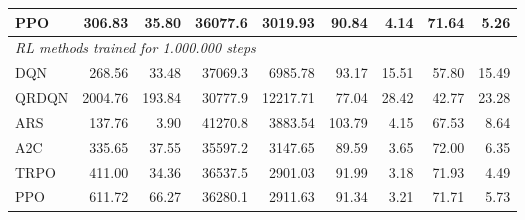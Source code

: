 \begin{samepage}
\begin{center}
\begin{tabular}{l|rr|rr|rr|rr}
    PPO          &   306.83 &    35.80 &    36077.6 &    3019.93 &   90.84 &    4.14 &   71.64 &    5.26 \\
    \midrule
    \multicolumn{9}{l}{\textit{RL methods trained for 1.000.000 steps}} \\
    \midrule
    DQN          &   268.56 &    33.48 &    37069.3 &    6985.78 &   93.17 &   15.51 &   57.80 &   15.49 \\
    QRDQN        &  2004.76 &   193.84 &    30777.9 &   12217.71 &   77.04 &   28.42 &   42.77 &   23.28 \\
    ARS          &   137.76 &     3.90 &    41270.8 &    3883.54 &  103.79 &    4.15 &   67.53 &    8.64 \\
    A2C          &   335.65 &    37.55 &    35597.2 &    3147.65 &   89.59 &    3.65 &   72.00 &    6.35 \\
    TRPO         &   411.00 &    34.36 &    36537.5 &    2901.03 &   91.99 &    3.18 &   71.93 &    4.49 \\
    PPO          &   611.72 &    66.27 &    36280.1 &    2911.63 &   91.34 &    3.21 &   71.71 &    5.73 \\
    \bottomrule
  \end{tabular}
\end{center}
\end{samepage}

